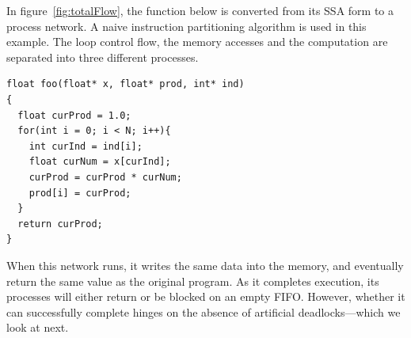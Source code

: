 \documentclass{sig-alternate}
\begin{document}
In figure~\ref{fig:totalFlow}, the function below is converted from its SSA form to a process network.  A naive instruction partitioning algorithm is used in this example. The loop control flow, the memory accesses and the computation are separated into three different
processes.

\begin{lstlisting}
float foo(float* x, float* prod, int* ind)
{
  float curProd = 1.0;
  for(int i = 0; i < N; i++){
    int curInd = ind[i];
    float curNum = x[curInd];
    curProd = curProd * curNum;
    prod[i] = curProd;
  }
  return curProd;
}
\end{lstlisting}
When this network runs, it writes the same data into the memory, and eventually return
the same value as the original program. As it completes execution, its processes will either return or be blocked on an empty FIFO. However, whether it can successfully complete hinges on
the absence of artificial deadlocks---which we look at next.
\end{document}
